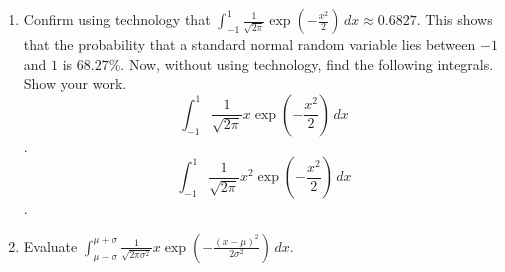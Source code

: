 \documentclass{article}
\begin{document}
\begin{enumerate}
                    \item Confirm using technology that $\displaystyle \int_{-1}^{1} \frac{1}{\sqrt{2\pi}} \exp\left(-\frac{x^2}{2}\right)\,dx \approx 0.6827$. This shows that the probability that a standard normal random variable lies between $-1$ and $1$ is $68.27\%$. Now, without using technology, find the following integrals. Show your work.
                    $$\displaystyle \int_{-1}^{1} \frac{1}{\sqrt{2\pi}}x \exp\left(-\frac{x^2}{2}\right)\,dx$$.
                    $$\displaystyle \int_{-1}^{1} \frac{1}{\sqrt{2\pi}}x^2 \exp\left(-\frac{x^2}{2}\right)\,dx$$.
                    \item Evaluate $\displaystyle \int_{\mu-\sigma}^{\mu+\sigma} \frac{1}{\sqrt{2\pi \sigma^2}}x \exp\left(-\frac{(x-\mu)^2}{2\sigma^2}\right)\,dx$.

                \end{enumerate}
\end{document}
